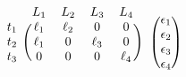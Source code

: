 \[
\begin{array}[t]{cc}
  \begin{blockarray}{ccccc}
  & L_1 & L_2 & L_3 & L_4  \\
  \begin{block}{c(cccc)}
  t_1 & \ell_1 & \ell_2 & 0           & 0 \\
  t_2 & \ell_1 &  0          & \ell_3 & 0 \\
  t_3 & 0           &  0          & 0           & \ell_4 \\
  \end{block}
  \end{blockarray}
  
  &
  
  \begin{blockarray}{c}
    \vphantom{L_1} \\
    \begin{block}{(c)}
      \e_1 \\
      \e_2 \\
      \e_3 \\
      \e_4 \\
    \end{block}
  \end{blockarray}
\end{array}
  \]
